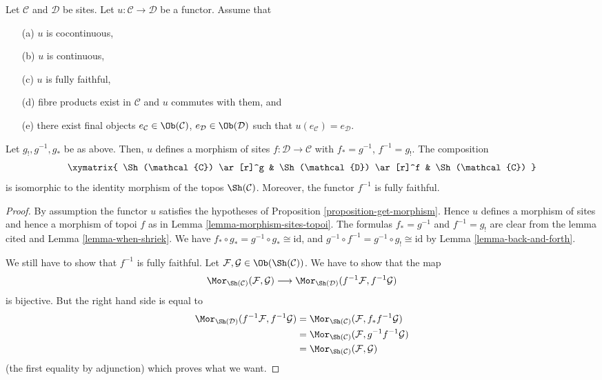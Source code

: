 \begin{lemma}
\label{lemma-bigger-site}
Let $\mathcal{C}$ and $\mathcal{D}$ be sites.
Let $u : \mathcal{C} \to \mathcal{D}$ be a functor.
Assume that
\begin{enumerate}
\item[(a)] $u$ is cocontinuous,
\item[(b)] $u$ is continuous,
\item[(c)] $u$ is fully faithful,
\item[(d)] fibre products exist in $\mathcal{C}$ and $u$ commutes with them,
and
\item[(e)] there exist final objects
$e_\mathcal{C} \in \Ob(\mathcal{C})$,
$e_\mathcal{D} \in \Ob(\mathcal{D})$ such that
$u(e_\mathcal{C}) = e_\mathcal{D}$.
\end{enumerate}
Let $g_!, g^{-1}, g_*$ be as above. Then, $u$ defines a morphism of sites
$f : \mathcal{D} \to \mathcal{C}$ with $f_* = g^{-1}$, $f^{-1} = g_!$.
The composition
$$
\xymatrix{
\Sh(\mathcal{C}) \ar[r]^g &
\Sh(\mathcal{D}) \ar[r]^f &
\Sh(\mathcal{C})
}
$$
is isomorphic to the identity morphism of the topos
$\Sh(\mathcal{C})$. Moreover, the functor $f^{-1}$ is fully faithful.
\end{lemma}

\begin{proof}
By assumption the functor $u$ satisfies the hypotheses of
Proposition \ref{proposition-get-morphism}. Hence $u$ defines
a morphism of sites and hence a morphism of topoi $f$ as in
Lemma \ref{lemma-morphism-sites-topoi}. The formulas
$f_* = g^{-1}$ and $f^{-1} = g_!$ are clear from the lemma cited and
Lemma \ref{lemma-when-shriek}.
We have
$f_* \circ g_* = g^{-1} \circ g_* \cong \text{id}$, and
$g^{-1} \circ f^{-1} = g^{-1} \circ g_! \cong \text{id}$
by Lemma \ref{lemma-back-and-forth}.

\medskip\noindent
We still have to show that $f^{-1}$ is fully faithful.
Let $\mathcal{F}, \mathcal{G} \in \Ob(\Sh(\mathcal{C}))$.
We have to show that the map
$$
\Mor_{\Sh(\mathcal{C})}(\mathcal{F}, \mathcal{G})
\longrightarrow
\Mor_{\Sh(\mathcal{D})}(f^{-1}\mathcal{F}, f^{-1}\mathcal{G})
$$
is bijective. But the right hand side is equal to
\begin{align*}
\Mor_{\Sh(\mathcal{D})}(f^{-1}\mathcal{F}, f^{-1}\mathcal{G})
& =
\Mor_{\Sh(\mathcal{C})}(\mathcal{F}, f_*f^{-1}\mathcal{G}) \\
& =
\Mor_{\Sh(\mathcal{C})}(\mathcal{F}, g^{-1}f^{-1}\mathcal{G}) \\
& =
\Mor_{\Sh(\mathcal{C})}(\mathcal{F}, \mathcal{G})
\end{align*}
(the first equality by adjunction) which proves what we want.
\end{proof}

